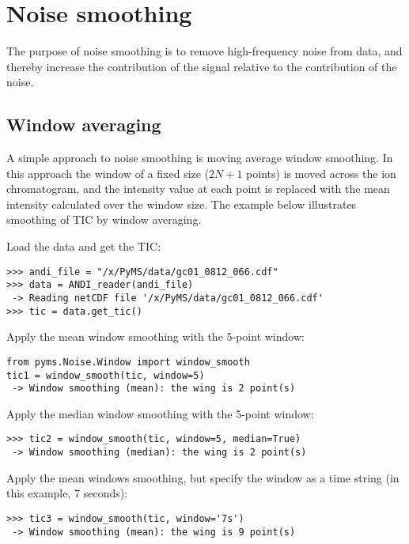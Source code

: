 \section{Noise smoothing}

The purpose of noise smoothing is to remove high-frequency noise from
data, and thereby increase the contribution of the signal relative to
the contribution of the noise.

\subsection{Window averaging}


A simple approach to noise smoothing is moving average window smoothing.
In this approach the window of a fixed size ($2N+1$ points) is moved
across the ion chromatogram, and the intensity value at each point is
replaced with the mean intensity calculated over the window size.
The example below illustrates smoothing of TIC by window averaging.

Load the data and get the TIC:

\begin{verbatim}
>>> andi_file = "/x/PyMS/data/gc01_0812_066.cdf"
>>> data = ANDI_reader(andi_file)
 -> Reading netCDF file '/x/PyMS/data/gc01_0812_066.cdf'
>>> tic = data.get_tic()
\end{verbatim}

Apply the mean window smoothing with the 5-point window:

\begin{verbatim}
from pyms.Noise.Window import window_smooth
tic1 = window_smooth(tic, window=5)
 -> Window smoothing (mean): the wing is 2 point(s)
\end{verbatim}

Apply the median window smoothing with the 5-point window:

\begin{verbatim}
>>> tic2 = window_smooth(tic, window=5, median=True)
 -> Window smoothing (median): the wing is 2 point(s)
\end{verbatim}

Apply the mean windows smoothing, but specify the window as
a time string (in this example, 7 seconds):

\begin{verbatim}
>>> tic3 = window_smooth(tic, window='7s')
 -> Window smoothing (mean): the wing is 9 point(s)
\end{verbatim}


